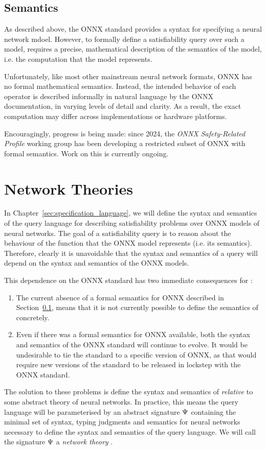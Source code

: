 \subsection{Semantics}
\label{sec:onnx-semantics}

As described above, the ONNX standard provides a syntax for specifying a neural network mdoel. However, to formally define a satisfiability query over such a model, requires a precise, mathematical description of the semantics of the model, i.e. the computation that the model represents. 

Unfortunately, like most other mainstream neural network formats, ONNX has no formal mathematical semantics. 
Instead, the intended behavior of each operator is described informally in natural language by the ONNX documentation, in varying levels of detail and clarity. 
As a result, the exact computation may differ across implementations or hardware platforms.

Encouragingly, progress is being made: since 2024, the \emph{ONNX Safety-Related Profile} working group has been developing a restricted subset of ONNX with formal semantics. 
Work on this is currently ongoing.

\section{Network Theories}
\label{sec:network-theory}

In Chapter~\ref{sec:specification_language}, we will define the syntax and semantics of the \vnnlib{} query language for describing satisfiability problems over ONNX models of neural networks.
The goal of a satisfiability query is to reason about the behaviour of the function that the ONNX model represents (i.e. its semantics).
Therefore, clearly it is unavoidable that the syntax and semantics of a query will depend on the syntax and semantics of the ONNX models.

This dependence on the ONNX standard has two immediate consequences for \vnnlib{}:
\begin{enumerate}
\item The current absence of a formal semantics for ONNX described in Section~\ref{sec:onnx-semantics}, means that it is not currently possible to define the semantics of \vnnlib{} concretely.
\item Even if there was a formal semantics for ONNX available, both the syntax and semantics of the ONNX standard will continue to evolve. 
It would be undesirable to tie the \vnnlib{} standard to a specific version of ONNX, as that would require new versions of the \vnnlib{} standard to be released in lockstep with the ONNX standard.
\end{enumerate}
The solution to these problems is define the syntax and semantics of \vnnlib{} \emph{relative} to some abstract theory of neural networks.
In practice, this means the \vnnlib{} query language will be parameterised by an abstract signature $\Psi$ containing the minimal set of syntax, typing judgments and semantics for neural networks necessary to define the syntax and semantics of the query language.
We will call the signature $\Psi$ a \emph{network theory} . 

